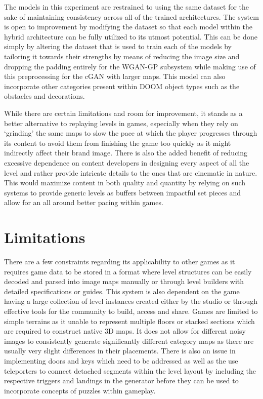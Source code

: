 \documentclass{Configuration_Files/PoliMi3i_thesis}
\begin{document}
The models in this experiment are restrained to using the same dataset for the sake of 
maintaining consistency across all of the trained architectures. The system is open to 
improvement by modifying the dataset so that each model within the hybrid 
architecture can be fully utilized to its utmost potential. This can be done simply by 
altering the dataset that is used to train each of the models by tailoring it towards 
their strengths by means of reducing the image size and dropping the padding
entirely for the WGAN-GP subsystem while making use of this preprocessing for the 
cGAN with larger maps. This model can also incorporate other categories present within 
DOOM object types such as the obstacles and decorations.

While there are certain limitations and room for improvement, it stands as a better 
alternative to replaying levels in games, especially when they rely on ‘grinding’ 
the same maps to slow the pace at which the player progresses through its content 
to avoid them from finishing the game too quickly as it might indirectly affect their brand 
image. There is also the added benefit of reducing excessive dependence on content 
developers in designing every aspect of all the level and rather provide  intricate details 
to the ones that are cinematic in nature. This would maximize content in both quality and 
quantity by relying on such systems to provide generic levels as buffers between impactful 
set pieces and allow for an all around better pacing within games.

\section{Limitations}
There are a few constraints regarding its applicability to other games as it requires 
game data to be stored in a format where level structures can be easily decoded and 
parsed into image maps manually or through level builders with detailed 
specifications or guides. This system is also dependent on the game having a large 
collection of level instances created either by the studio or through effective tools for 
the community to build, access and share. Games are limited to simple terrains as it 
unable to represent multiple floors or stacked sections which are required to construct 
native 3D maps. It does not allow for different noisy images to consistently generate
significantly different category maps as there are usually very slight differences in 
their placements. There is also an issue in implementing doors and keys which need 
to be addressed as well as the use teleporters to connect detached segments within 
the level layout by including the respective triggers and landings in the generator 
before they can be used to incorporate concepts of puzzles within gameplay. 
\end{document}

